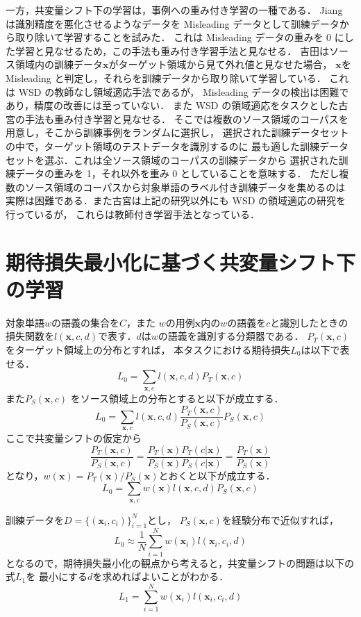 \documentclass[japanese]{jnlp_1.4}
\begin{document}
一方，共変量シフト下の学習は，事例への重み付き学習の一種である．
Jiang は識別精度を悪化させるようなデータを
Misleading データとして訓練データから取り除いて学習することを試みた\cite{jiang2007instance}．
これは Misleading データの重みを 0 にした学習と見なせるため，この手法も重み付き学習手法と見なせる．
吉田はソース領域内の訓練データ${\bm x}$がターゲット領域から見て外れ値と見なせた場合，
${\bm x}$をMisleading と判定し，それらを訓練データから取り除いて学習している\cite{yoshida}．
これは WSD の教師なし領域適応手法であるが，
Misleading データの検出は困難であり，精度の改善には至っていない．
また WSD の領域適応をタスクとした古宮の手法\cite{komiya-nenji2013}も重み付き学習と見なせる．
そこでは複数のソース領域のコーパスを用意し，そこから訓練事例をランダムに選択し，
選択された訓練データセットの中で，ターゲット領域のテストデータを識別するのに
最も適した訓練データセットを選ぶ．これは全ソース領域のコーパスの訓練データから
選択された訓練データの重みを 1，それ以外を重み 0 としていることを意味する．
ただし複数のソース領域のコーパスから対象単語のラベル付き訓練データを集めるのは
実際は困難である．また古宮は上記の研究以外にも 
WSD の領域適応の研究\cite{komiya3,komiya2,komiya-nlp2012}を行っているが，
これらは教師付き学習手法となっている．


\section{期待損失最小化に基づく共変量シフト下の学習}

対象単語$w$の語義の集合を$C$，また
$w$の用例${\bm x}$内の$w$の語義を$c$と識別したときの
損失関数を$l({\bm x},c,d)$で表す．$d$は$w$の語義を識別する分類器である．
$P_T({\bm x},c)$ をターゲット領域上の分布とすれば，
本タスクにおける期待損失$L_0$は以下で表せる．
\[
L_0 = \sum_{{\bm x},c} l({\bm x},c,d) P_T({\bm x},c)
\]
また$P_S({\bm x},c)$ をソース領域上の分布とすると以下が成立する．
\[
L_0 = \sum_{{\bm x},c} l({\bm x},c,d) \frac{P_T({\bm x},c)}{P_S({\bm x},c)} P_S({\bm x},c)
\]
ここで共変量シフトの仮定から
\[
\frac{P_T({\bm x},c)}{P_S({\bm x},c)} = \frac{P_T({\bm x})P_T(c|{\bm x})}{P_S({\bm x})P_S(c|{\bm x})} = \frac{P_T({\bm x})}{P_S({\bm x})}
\]
となり，$w({\bm x}) = P_T({\bm x})/P_S({\bm x})$とおくと以下が成立する．
\[
L_0 = \sum_{{\bm x},c} w({\bm x}) l({\bm x},c,d) P_S({\bm x},c)
\]

訓練データを$D = \{ ({\bm x_i},c_i) \}_{i = 1}^N$とし，
$P_S({\bm x},c)$を経験分布で近似すれば，
\[
 L_0 \approx  \frac{1}{N} \sum_{i=1}^N w({\bm x_i}) l({\bm x_i},c_i,d) 
\]
となるので，期待損失最小化の観点から考えると，共変量シフトの問題は以下の式$L_1$を
最小にする$d$を求めればよいことがわかる．
\begin{equation}
    \label{eq:1}
L_1 = \sum_{i=1}^N w({\bm x_i}) l({\bm x_i},c_i,d) 
\end{equation}
\end{document}
